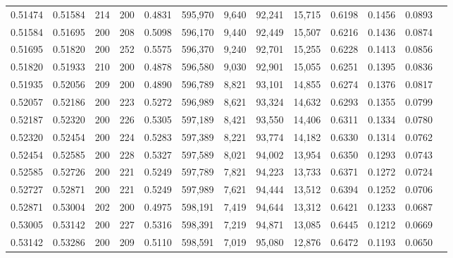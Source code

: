 \begin{tabular}{rrrrrrrrrrrrr}
0.51474 & 0.51584 &    214 & 200 &                                     0.4831 & 595,970 &   9,640 &  92,241 &  15,715 & 0.6198 & 0.1456 & 0.0893 \\
0.51584 & 0.51695 &    200 & 208 &                                     0.5098 & 596,170 &   9,440 &  92,449 &  15,507 & 0.6216 & 0.1436 & 0.0874 \\
0.51695 & 0.51820 &    200 & 252 &                                     0.5575 & 596,370 &   9,240 &  92,701 &  15,255 & 0.6228 & 0.1413 & 0.0856 \\
0.51820 & 0.51933 &    210 & 200 &                                     0.4878 & 596,580 &   9,030 &  92,901 &  15,055 & 0.6251 & 0.1395 & 0.0836 \\
0.51935 & 0.52056 &    209 & 200 &                                     0.4890 & 596,789 &   8,821 &  93,101 &  14,855 & 0.6274 & 0.1376 & 0.0817 \\
0.52057 & 0.52186 &    200 & 223 &                                     0.5272 & 596,989 &   8,621 &  93,324 &  14,632 & 0.6293 & 0.1355 & 0.0799 \\
0.52187 & 0.52320 &    200 & 226 &                                     0.5305 & 597,189 &   8,421 &  93,550 &  14,406 & 0.6311 & 0.1334 & 0.0780 \\
0.52320 & 0.52454 &    200 & 224 &                                     0.5283 & 597,389 &   8,221 &  93,774 &  14,182 & 0.6330 & 0.1314 & 0.0762 \\
0.52454 & 0.52585 &    200 & 228 &                                     0.5327 & 597,589 &   8,021 &  94,002 &  13,954 & 0.6350 & 0.1293 & 0.0743 \\
0.52585 & 0.52726 &    200 & 221 &                                     0.5249 & 597,789 &   7,821 &  94,223 &  13,733 & 0.6371 & 0.1272 & 0.0724 \\
0.52727 & 0.52871 &    200 & 221 &                                     0.5249 & 597,989 &   7,621 &  94,444 &  13,512 & 0.6394 & 0.1252 & 0.0706 \\
0.52871 & 0.53004 &    202 & 200 &                                     0.4975 & 598,191 &   7,419 &  94,644 &  13,312 & 0.6421 & 0.1233 & 0.0687 \\
0.53005 & 0.53142 &    200 & 227 &                                     0.5316 & 598,391 &   7,219 &  94,871 &  13,085 & 0.6445 & 0.1212 & 0.0669 \\
0.53142 & 0.53286 &    200 & 209 &                                     0.5110 & 598,591 &   7,019 &  95,080 &  12,876 & 0.6472 & 0.1193 & 0.0650 \\

\end{tabular}
